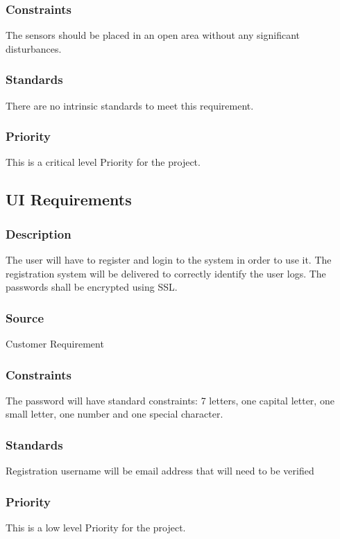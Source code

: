 \subsubsection{Constraints}
The sensors should be placed in an open area without any significant disturbances.
\subsubsection{Standards}
There are no intrinsic standards to meet this requirement.
\subsubsection{Priority}
This is a critical level Priority for the project.

\subsection{UI Requirements}
\subsubsection{Description}
The user will have to register and login to the system in order to use it. The registration system will be delivered to correctly identify the user logs. The passwords shall be encrypted using SSL.
\subsubsection{Source}
Customer Requirement
\subsubsection{Constraints}
The password will have standard constraints: 7 letters, one capital letter, one small letter, one number and one special character.
\subsubsection{Standards}
Registration username will be email address that will need to be verified
\subsubsection{Priority}
This is a low level Priority for the project.
